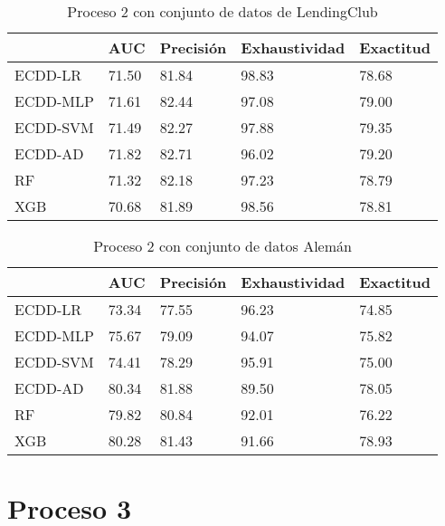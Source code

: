 \begin{table}[]
\centering
\caption{Proceso 2 con conjunto de datos de LendingClub}
\label{tab:lc-proc2}
\begin{tabularx}{0.75\textwidth}{|l|Y Y Y Y|}
                \hline
                & AUC       & Precisión & Exhaustividad    & Exactitud  \\
                \hline
ECDD-LR           & 71.50     & 81.84     & 98.83     & 78.68     \\
ECDD-MLP          & 71.61     & 82.44     & 97.08     & 79.00     \\
ECDD-SVM          & 71.49     & 82.27     & 97.88     & 79.35     \\
ECDD-AD           & 71.82     & 82.71     & 96.02     & 79.20     \\
                \hline
RF              & 71.32     & 82.18     & 97.23     & 78.79     \\
XGB             & 70.68     & 81.89     & 98.56     & 78.81     \\
                \hline
\end{tabularx}
\end{table}


\begin{table}[]
\centering
\caption{Proceso 2 con conjunto de datos Alemán}
\label{tab:german-proc2}
\begin{tabularx}{0.75\textwidth}{|l|Y Y Y Y|}
                \hline
                & AUC       & Precisión & Exhaustividad    & Exactitud  \\
                \hline
ECDD-LR           & 73.34     & 77.55     & 96.23     & 74.85     \\
ECDD-MLP          & 75.67     & 79.09     & 94.07     & 75.82     \\
ECDD-SVM          & 74.41     & 78.29     & 95.91     & 75.00     \\
ECDD-AD           & 80.34     & 81.88     & 89.50     & 78.05     \\
                \hline
RF              & 79.82     & 80.84     & 92.01     & 76.22     \\
XGB             & 80.28     & 81.43     & 91.66     & 78.93     \\
                \hline
\end{tabularx}
\end{table}


\section{Proceso 3} %

